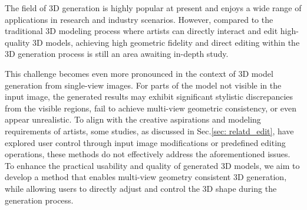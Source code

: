 

The field of 3D generation is highly popular at present and enjoys a wide range of applications in research and industry scenarios. However, compared to the traditional 3D modeling process where artists can directly interact and edit high-quality 3D models, achieving high geometric fidelity and direct editing within the 3D generation process is still an area awaiting in-depth study.

This challenge becomes even more pronounced in the context of 3D model generation from single-view images. For parts of the model not visible in the input image, the generated results may exhibit significant stylistic discrepancies from the visible regions, fail to achieve multi-view geometric consistency, or even appear unrealistic.
%
To align with the creative aspirations and modeling requirements of artists, some studies, as discussed in Sec.\ref{sec: relatd_edit}, have explored user control through input image modifications or predefined editing operations, these methods do not effectively address the aforementioned issues. 
To enhance the practical usability and quality of generated 3D models, we aim to develop a method that enables multi-view geometry consistent 3D generation, while allowing users to directly adjust and control the 3D shape during the generation process.

